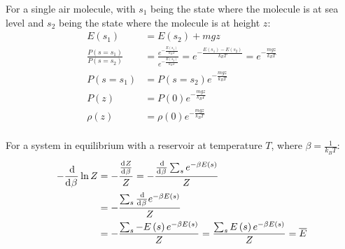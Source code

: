 \documentclass{article}
\begin{document}
\clearpage

For a single air molecule, with $s_1$ being the state where the molecule is at sea level and $s_2$ being the state where the molecule is at height $z$:
\begin{equation}
    \begin{split}
        E\left(s_1\right) & = E\left(s_2\right) + mgz \\
        \frac{P\left(s = s_1\right)}{P\left(s = s_2\right)} & = \frac{e^{-\frac{E\left(s_1\right)}{k_BT}}}{e^{-\frac{E\left(s_2\right)}{k_BT}}} = e^{-\frac{E\left(s_1\right) - E\left(s_2\right)}{k_BT}} = e^{-\frac{mgz}{k_BT}} \\
        P\left(s = s_1\right) & = P\left(s = s_2\right)e^{-\frac{mgz}{k_BT}} \\
        P\left(z\right) & = P\left(0\right)e^{-\frac{mgz}{k_BT}} \\
        \rho\left(z\right) & = \rho\left(0\right)e^{-\frac{mgz}{k_BT}} \\
    \end{split}
\end{equation}

\clearpage

For a system in equilibrium with a reservoir at temperature $T$, where $\beta = \frac{1}{k_BT}$:
\begin{equation}
    \begin{split}
        -\deriv{}{\beta} \ln{Z} & = -\frac{\deriv{Z}{\beta}}{Z} = -\frac{\deriv{}{\beta}\sum_s e^{-\beta E\left(s\right)}}{Z} \\
        & = -\frac{\sum_s \deriv{}{\beta} e^{-\beta E\left(s\right)}}{Z} \\
        & = -\frac{\sum_s -E\left(s\right)e^{-\beta E\left(s\right)}}{Z} = \frac{\sum_s E\left(s\right)e^{-\beta E\left(s\right)}}{Z} = \overline{E}
    \end{split}
\end{equation}

\clearpage
\end{document}
